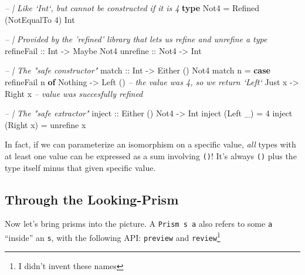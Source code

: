 \documentclass[]{article}
\newenvironment{Shaded}{}{}
\newcommand{\CommentTok}[1]{\textcolor[rgb]{0.38,0.63,0.69}{\textit{#1}}}
\newcommand{\DataTypeTok}[1]{\textcolor[rgb]{0.56,0.13,0.00}{#1}}
\newcommand{\DecValTok}[1]{\textcolor[rgb]{0.25,0.63,0.44}{#1}}
\newcommand{\FunctionTok}[1]{\textcolor[rgb]{0.02,0.16,0.49}{#1}}
\newcommand{\KeywordTok}[1]{\textcolor[rgb]{0.00,0.44,0.13}{\textbf{#1}}}
\newcommand{\NormalTok}[1]{#1}
\newcommand{\OtherTok}[1]{\textcolor[rgb]{0.00,0.44,0.13}{#1}}
\begin{document}
\begin{Shaded}
\begin{Highlighting}[]
\CommentTok{-- | Like `Int`, but cannot be constructed if it is 4}
\KeywordTok{type} \DataTypeTok{Not4} \FunctionTok{=} \DataTypeTok{Refined}\NormalTok{ (}\DataTypeTok{NotEqualTo} \DecValTok{4}\NormalTok{) }\DataTypeTok{Int}

\CommentTok{-- | Provided by the 'refined' library that lets us refine and unrefine a type}
\OtherTok{refineFail ::} \DataTypeTok{Int}  \OtherTok{->} \DataTypeTok{Maybe} \DataTypeTok{Not4}
\OtherTok{unrefine   ::} \DataTypeTok{Not4} \OtherTok{->} \DataTypeTok{Int}


\CommentTok{-- | The "safe constructor"}
\OtherTok{match ::} \DataTypeTok{Int} \OtherTok{->} \DataTypeTok{Either}\NormalTok{ () }\DataTypeTok{Not4}
\NormalTok{match n }\FunctionTok{=} \KeywordTok{case}\NormalTok{ refineFail n }\KeywordTok{of}
    \DataTypeTok{Nothing} \OtherTok{->} \DataTypeTok{Left}\NormalTok{ ()          }\CommentTok{-- the value was 4, so we return `Left`}
    \DataTypeTok{Just}\NormalTok{ x  }\OtherTok{->} \DataTypeTok{Right}\NormalTok{ x          }\CommentTok{-- value was succesfully refined}

\CommentTok{-- | The "safe extractor"}
\OtherTok{inject ::} \DataTypeTok{Either}\NormalTok{ () }\DataTypeTok{Not4} \OtherTok{->} \DataTypeTok{Int}
\NormalTok{inject (}\DataTypeTok{Left}\NormalTok{  _) }\FunctionTok{=} \DecValTok{4}
\NormalTok{inject (}\DataTypeTok{Right}\NormalTok{ x) }\FunctionTok{=}\NormalTok{ unrefine x}
\end{Highlighting}
\end{Shaded}

In fact, if we can parameterize an isomorphism on a specific value, \emph{all}
types with at least one value can be expressed as a sum involving \texttt{()}!
It's always \texttt{()} plus the type itself minus that given specific value.

\hypertarget{through-the-looking-prism}{%
\subsection{Through the Looking-Prism}\label{through-the-looking-prism}}

Now let's bring prisms into the picture. A
\texttt{Prism\textquotesingle{}\ s\ a} also refers to some \texttt{a} ``inside''
an \texttt{s}, with the following API: \texttt{preview} and
\texttt{review}\footnote{I didn't invent these names}
\end{document}

